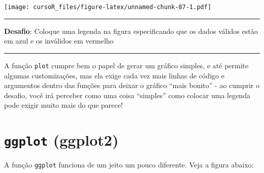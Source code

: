 \documentclass[]{book}
\newenvironment{Shaded}{\begin{snugshade}}{\end{snugshade}}
\newcommand{\KeywordTok}[1]{\textcolor[rgb]{0.13,0.29,0.53}{\textbf{#1}}}
\newcommand{\DataTypeTok}[1]{\textcolor[rgb]{0.13,0.29,0.53}{#1}}
\newcommand{\DecValTok}[1]{\textcolor[rgb]{0.00,0.00,0.81}{#1}}
\newcommand{\StringTok}[1]{\textcolor[rgb]{0.31,0.60,0.02}{#1}}
\newcommand{\OperatorTok}[1]{\textcolor[rgb]{0.81,0.36,0.00}{\textbf{#1}}}
\newcommand{\NormalTok}[1]{#1}
\theoremstyle{definition}
\theoremstyle{definition}
\theoremstyle{definition}
\theoremstyle{remark}
\begin{document}
\begin{Shaded}
\end{Shaded}

\texttt{[image: cursoR\_files/figure-latex/unnamed-chunk-87-1.pdf]}

\begin{center}\rule{0.5\linewidth}{\linethickness}\end{center}

{\textbf{Desafio}: Coloque uma legenda na figura especificando que os
dados válidos estão em azul e os inválidos em vermelho }

\begin{center}\rule{0.5\linewidth}{\linethickness}\end{center}

A função \texttt{plot} cumpre bem o papel de gerar um gráfico simples, e
até permite algumas customizações, mas ela exige cada vez mais linhas de
código e argumentos dentro das funções para deixar o gráfico ``mais
bonito'' - ao cumprir o desafio, você irá perceber como uma coisa
``simples'' como colocar uma legenda pode exigir muito mais do que
parece!

\section{\texorpdfstring{\texttt{ggplot}
(ggplot2)}{ggplot (ggplot2)}}\label{ggplot-ggplot2}

A função \texttt{ggplot} funciona de um jeito um pouco diferente. Veja a
figura abaixo:
\end{document}
